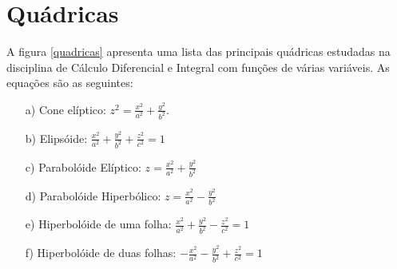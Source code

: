 \section{Quádricas}
A figura \ref{quadricas} apresenta uma lista das principais quádricas estudadas na disciplina de Cálculo Diferencial e Integral com funções de várias variáveis. As equações são as seguintes:
\begin{itemize}
\item[a)] Cone elíptico: $\displaystyle z^2=\frac{x^2}{a^2}+\frac{y^2}{b^2}$. 
\item[b)] Elipsóide: $\displaystyle \frac{x^2}{a^2}+\frac{y^2}{b^2}+\frac{z^2}{c^2}=1$
\item[c)] Parabolóide Elíptico: $\displaystyle z=\frac{x^2}{a^2}+\frac{y^2}{b^2}$
\item[d)] Parabolóide Hiperbólico: $\displaystyle z=\frac{x^2}{a^2}-\frac{y^2}{b^2}$
\item[e)] Hiperbolóide de uma folha: $\displaystyle \frac{x^2}{a^2}+\frac{y^2}{b^2}-\frac{z^2}{c^2}=1$
\item[f)] Hiperbolóide de duas folhas:  $\displaystyle -\frac{x^2}{a^2}-\frac{y^2}{b^2}+\frac{z^2}{c^2}=1$
\end{itemize}
